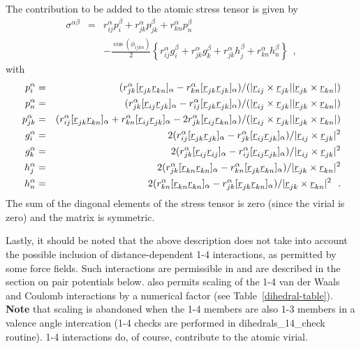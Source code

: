 The contribution to be added to the atomic stress tensor is given by
\begin{eqnarray}
\sigma^{\alpha \beta}&=&r_{ij}^{\alpha}p_{i}^{\beta}+
r_{jk}^{\alpha}p_{jk}^{\beta}+r_{kn}^{\alpha}p_{n}^{\beta} \\ & &
-\frac{\cos(\phi_{ijkn})}{2}\left \{r_{ij}^{\alpha}g_{i}^{\beta}+
r_{jk}^{\alpha}g_{k}^{\beta}+r_{jk}^{\alpha}h_{j}^{\beta}+r_{kn}^{\alpha}h_{n}^{\beta}\right\}
~~,\nonumber
\end{eqnarray}
with
\begin{eqnarray}
p_{i}^{\alpha}&=&(r_{jk}^{\alpha}[\mbox{$\underline{r}$}_{jk}\mbox{$\underline{r}$}_{kn}]_{\alpha}-
r_{kn}^{\alpha}[\mbox{$\underline{r}$}_{jk}\mbox{$\underline{r}$}_{jk}]_{\alpha})/
(|\mbox{$\underline{r}$}_{ij}\times\mbox{$\underline{r}$}_{jk}||\mbox{$\underline{r}$}_{jk}\times\mbox{$\underline{r}$}_{kn}|) \nonumber \\
p_{n}^{\alpha}&=&(r_{jk}^{\alpha}[\mbox{$\underline{r}$}_{ij}\mbox{$\underline{r}$}_{jk}]_{\alpha}-
r_{ij}^{\alpha}[\mbox{$\underline{r}$}_{jk}\mbox{$\underline{r}$}_{jk}]_{\alpha})/
(|\mbox{$\underline{r}$}_{ij}\times\mbox{$\underline{r}$}_{jk}||\mbox{$\underline{r}$}_{jk}\times\mbox{$\underline{r}$}_{kn}|) \nonumber \\
p_{jk}^{\alpha}&=&(r_{ij}^{\alpha}[\mbox{$\underline{r}$}_{jk}\mbox{$\underline{r}$}_{kn}]_{\alpha}+
r_{kn}^{\alpha}[\mbox{$\underline{r}$}_{ij}\mbox{$\underline{r}$}_{jk}]_{\alpha}-
2r_{jk}^{\alpha}[\mbox{$\underline{r}$}_{ij}\mbox{$\underline{r}$}_{kn}]_{\alpha})/
(|\mbox{$\underline{r}$}_{ij}\times\mbox{$\underline{r}$}_{jk}||\mbox{$\underline{r}$}_{jk}\times\mbox{$\underline{r}$}_{kn}|) \nonumber \\
g_{i}^{\alpha}&=&2(r_{ij}^{\alpha}[\mbox{$\underline{r}$}_{jk}\mbox{$\underline{r}$}_{jk}]_{\alpha}-
r_{jk}^{\alpha}[\mbox{$\underline{r}$}_{ij}\mbox{$\underline{r}$}_{jk}]_{\alpha})/
|\mbox{$\underline{r}$}_{ij}\times\mbox{$\underline{r}$}_{jk}|^{2} \\
g_{k}^{\alpha}&=&2(r_{jk}^{\alpha}[\mbox{$\underline{r}$}_{ij}\mbox{$\underline{r}$}_{ij}]_{\alpha}-
r_{ij}^{\alpha}[\mbox{$\underline{r}$}_{ij}\mbox{$\underline{r}$}_{jk}]_{\alpha})/
|\mbox{$\underline{r}$}_{ij}\times\mbox{$\underline{r}$}_{jk}|^{2} \nonumber \\
h_{j}^{\alpha}&=&2(r_{jk}^{\alpha}[\mbox{$\underline{r}$}_{kn}\mbox{$\underline{r}$}_{kn}]_{\alpha}-
r_{kn}^{\alpha}[\mbox{$\underline{r}$}_{jk}\mbox{$\underline{r}$}_{kn}]_{\alpha})/
|\mbox{$\underline{r}$}_{jk}\times\mbox{$\underline{r}$}_{kn}|^{2} \nonumber \\
h_{n}^{\alpha}&=&2(r_{kn}^{\alpha}[\mbox{$\underline{r}$}_{kn}\mbox{$\underline{r}$}_{kn}]_{\alpha}-
r_{jk}^{\alpha}[\mbox{$\underline{r}$}_{jk}\mbox{$\underline{r}$}_{kn}]_{\alpha})/
|\mbox{$\underline{r}$}_{jk}\times\mbox{$\underline{r}$}_{kn}|^{2}~~. \nonumber
\end{eqnarray}
The sum of the diagonal elements of the stress tensor is zero (since the virial is zero) and the matrix is
symmetric.

Lastly, it should be noted that the above description does not
take into account the possible inclusion of distance-dependent 1-4
interactions, as permitted by some force fields.  Such interactions are permissible in \D and are described
in the section on pair potentials below.  \D also permits scaling
of the 1-4 van der Waals and Coulomb
 interactions by a numerical
factor (see Table~\ref{dihedral-table}).  {\bf Note} that scaling
is abandoned when the 1-4 members are also 1-3 members in a valence
angle intercation (1-4 checks are
performed in {\sc dihedrals\_14\_check} routine).  1-4 interactions
do, of course, contribute to the atomic virial.

